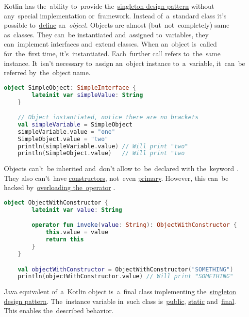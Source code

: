 \label{kotlinobject}
Kotlin has the~ability to~provide the~\hyperref[singletondp]{singleton design pattern} without any~special implementation or~framework.
Instead of~a~standard class it's possible to~\hyperref[declarationdefinition]{define} an~\textit{object}.
Objects are almost (but~not~completely) same as~classes.
They can~be instantiated and~assigned to~variables, they can~implement interfaces and~extend classes.
When an~object is~called for~the~first time, it's~instantiated.
Each~further call refers to~the~same instance.
It~isn't necessary to~assign an~object instance to~a~variable, it~can~be referred by~the~object name.

\begin{lstlisting}[language=Kotlin]
    object SimpleObject: SimpleInterface {
        lateinit var simpleValue: String
    }

    // Object instantiated, notice there are no brackets
    val simpleVariable = SimpleObject
    simpleVariable.value = "one"
    SimpleObject.value = "two"
    println(simpleVariable.value) // Will print "two"
    println(SimpleObject.value)   // Will print "two
\end{lstlisting}

\noindent Objects can't~be inherited and~don't allow to~be~declared with the~keyword .
They also can't~have \hyperref[kotlinconstructor]{constructors}, not~even \hyperref[kotlinprimaryconstructor]{primary}.
However, this can~be hacked by~\hyperref[kotlinoperatoroverload]{overloading the~operator} .

\begin{lstlisting}[language=Kotlin]
    object ObjectWithConstructor {
        lateinit var value: String

        operator fun invoke(value: String): ObjectWithConstructor {
            this.value = value
            return this
        }
    }

    val objectWithConstructor = ObjectWithConstructor("SOMETHING")
    println(objectWithConstructor.value) // Will print "SOMETHING"
\end{lstlisting}
\newline

\noindent Java equivalent of~a~Kotlin object is~a~final class implementing the~\hyperref[singletondp]{singleton design pattern}.
The~instance variable in~such class is~\hyperref[javapublic]{public}, \hyperref[javastatic]{static} and~\hyperref[javafinal]{final}.
This enables the~described behavior.
\newpage

